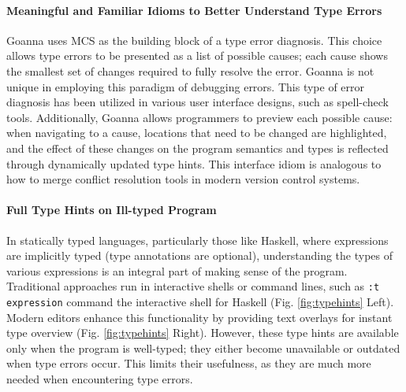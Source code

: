 \documentclass[pdflatex,lineno,sn-nature,Numbered]{sn-jnl}%
\begin{document}
\paragraph{Meaningful and Familiar Idioms to Better Understand Type Errors}

Goanna uses MCS as the building block of a type error diagnosis. This choice allows type errors to be presented as a list of possible causes; each cause shows the smallest set of changes required to fully resolve the error. Goanna is not unique in employing this paradigm of debugging errors. This type of error diagnosis has been utilized in various user interface designs, such as spell-check tools. Additionally, Goanna allows programmers to preview each possible cause: when navigating to a cause, locations that need to be changed are highlighted, and the effect of these changes on the program semantics and types is reflected through dynamically updated type hints. This interface idiom is analogous to how to merge conflict resolution tools in modern version control systems.



\paragraph{Full Type Hints on Ill-typed Program}

In statically typed languages, particularly those like Haskell, where expressions are implicitly typed (type annotations are optional), understanding the types of various expressions is an integral part of making sense of the program. Traditional approaches run in interactive shells or command lines, such as \texttt{:t expression} command the interactive shell for Haskell (Fig. \ref{fig:typehints} Left). Modern editors enhance this functionality by providing text overlays for instant type overview (Fig. \ref{fig:typehints} Right). However, these type hints are available only when the program is well-typed; they either become unavailable or outdated when type errors occur. This limits their usefulness, as they are much more needed when encountering type errors.
\end{document}
